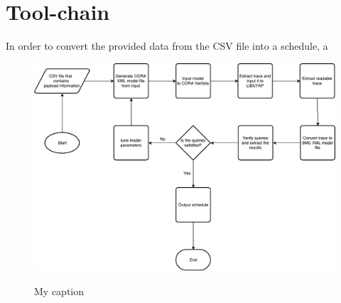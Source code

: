 \section{Tool-chain} \label{sec:tool_chain}
In order to convert the provided data from the CSV file into a schedule, a 
\begin{figure}
	\includegraphics{graphics/tool_chain.pdf}
	\label{fig:tool_chain}
	\caption{My caption}
\end{figure}